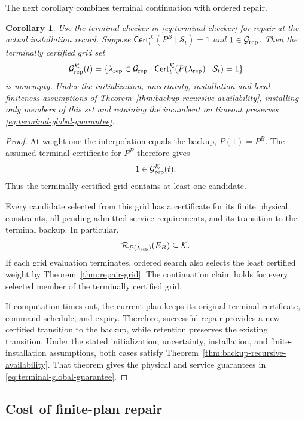 \documentclass[preprint,12pt]{elsarticle}
\newtheorem{corollary}{Corollary}
\begin{document}
The next corollary combines terminal continuation with ordered repair.

\begin{corollary}
\label{cor:repair-recursive}
Use the terminal checker in \eqref{eq:terminal-checker} for repair
at the actual installation record. Suppose
$\mathsf{Cert}^{\mathcal K}_t(P^B\mid\mathcal S_t)=1$ and
$1\in\mathcal G_{\rm rep}$. Then the terminally certified grid set
\begin{equation}
\mathcal G_{\rm rep}^{\mathcal K}(t)=
\{\lambda_{\rm rep}\in\mathcal G_{\rm rep}:
\mathsf{Cert}^{\mathcal K}_t(P(\lambda_{\rm rep})\mid\mathcal S_t)=1\}
\label{eq:repair-terminal-grid}
\end{equation}
is nonempty. Under the initialization, uncertainty, installation and
local-finiteness assumptions of
Theorem~\ref{thm:backup-recursive-availability}, installing only members
of this set and retaining the incumbent on timeout preserves
\eqref{eq:terminal-global-guarantee}.
\end{corollary}

\begin{proof}
At weight one the interpolation equals the backup, $P(1)=P^B$.
The assumed terminal certificate for $P^B$ therefore gives
\[
 1\in\mathcal G_{\rm rep}^{\mathcal K}(t).
\]
Thus the terminally certified grid contains at least one candidate.

Every candidate selected from this grid has a certificate for its finite
physical constraints, all pending admitted service requirements, and its
transition to the terminal backup. In particular,
\[
 \mathcal R_{P(\lambda_{\rm rep})}(E_B)\subseteq\mathcal K.
\]
If each grid evaluation terminates, ordered search also selects the least
certified weight by Theorem~\ref{thm:repair-grid}. The continuation claim
holds for every selected member of the terminally certified grid.

If computation times out, the current plan keeps its original terminal
certificate, command schedule, and expiry. Therefore, successful repair
provides a new certified transition to the backup, while retention
preserves the existing transition. Under the stated initialization,
uncertainty, installation, and finite-installation assumptions, both cases
satisfy Theorem~\ref{thm:backup-recursive-availability}. That theorem gives
the physical and service guarantees in
\eqref{eq:terminal-global-guarantee}.
\end{proof}

\subsection{Cost of finite-plan repair}
\label{sec:repair-cost-bound}
\end{document}
